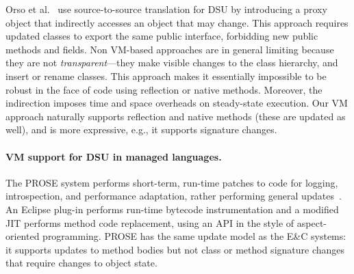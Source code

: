 \documentclass[9pt]{sigplanconf}
\begin{document}


Orso et al.~\cite{orso:java} use source-to-source translation for DSU
by introducing a proxy object that indirectly accesses
an object that may change.  
This approach requires updated classes to export the same public
interface, forbidding new public methods and
fields.
Non VM-based approaches are in general limiting because they are
not \emph{transparent}---they make visible changes to the class hierarchy,
and insert or rename classes.  This approach makes it essentially
impossible to be robust in the face of code using reflection or native
methods.  Moreover, the indirection imposes time and space overheads
on steady-state execution.  Our VM approach
naturally supports reflection and native methods (these are updated
as well), and is more expressive, e.g., it supports signature changes.

\paragraph{VM support for DSU in managed languages.} 
The PROSE system performs short-term, run-time patches to code for
logging, introspection, and performance adaptation, rather performing
general updates~\cite{nicoara:eurosys08}.  An Eclipse plug-in performs
run-time bytecode instrumentation and a modified JIT performs method
code replacement, using an API in the style of aspect-oriented
programming.  %
PROSE has the same update model as the E\&C systems: it supports updates to method bodies but not
class or method signature changes that require changes to object state. 
\end{document}
